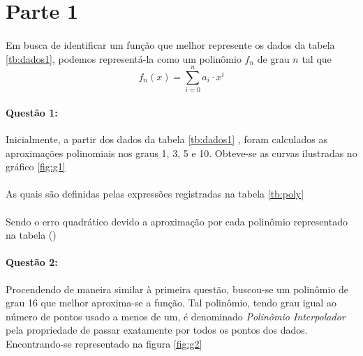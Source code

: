 \documentclass[a4paper,11pt]{article}
\title{\tituloCapa}
\begin{document}


\section{Parte 1}
\paragraph{}Em busca de identificar um função que melhor represente os dados da tabela \ref{tb:dados1}, podemos representá-la como um polinômio $f_n$ de grau $n$ tal que
\begin{equation}
f_n(x) = \sum_{i=0}^{n} a_i\cdot x^{i}
\end{equation}
\paragraph{Questão 1:}Inicialmente, a partir dos dados da tabela \ref{tb:dados1} , foram calculados as aproximações polinomiais nos graus 1, 3, 5 e 10. Obteve-se as curvas ilustradas no gráfico \ref{fig:g1}
\paragraph{}As quais são definidas pelas expressões registradas na tabela \ref{tb:poly}


\paragraph{}Sendo o erro quadrático devido a aproximação por cada polinômio representado na tabela ()


\paragraph{Questão 2:}Procendendo de maneira similar à primeira questão, buscou-se um polinômio de grau 16 que melhor aproxima-se a função. Tal polinômio, tendo grau igual ao número de pontos usado a menos de um, é denominado \textit{Polinômio Interpolador} pela propriedade de passar exatamente por todos os pontos dos dados. Encontrando-se representado na figura \ref{fig:g2}
\end{document}
